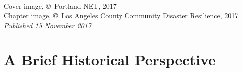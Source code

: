 \documentclass[11pt,fleqn]{book} %
\begin{document}
\newpage
~\vfill
\thispagestyle{empty}

\noindent Cover image, \copyright\ Portland NET, 2017\\ %
\noindent Chapter image, \copyright\ Los Angeles County Community Disaster Resilience, 2017\\ %
\noindent \textit{Published 15 November 2017} %






\pagestyle{empty} %

\renewcommand\contentsname{Table of Contents}
\renewcommand{\bibname}{Bibliography}
\tableofcontents%


\pagestyle{fancy} %

\chapter{A Brief Historical Perspective}
\end{document}
